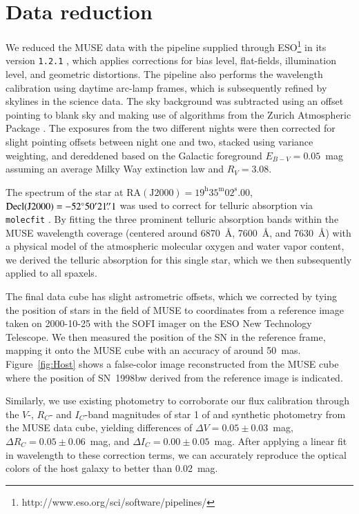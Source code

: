 \documentclass[traditabstract]{aa}
\newcommand{\farc}{\hbox{$.\!\!^{\prime\prime}$}}
\begin{document}
\section{Data reduction}
\label{sec:red}
We reduced the MUSE data with the pipeline supplied through ESO\footnote{http://www.eso.org/sci/software/pipelines/} in its version \texttt{1.2.1} \citep{2014ASPC..485..451W}, which applies corrections for bias level, flat-fields, illumination level, and geometric distortions. The pipeline also performs the wavelength calibration using daytime arc-lamp frames, which is subsequently refined by skylines in the science data. The sky background was subtracted using an offset pointing to blank sky and making use of algorithms from the Zurich Atmospheric Package \citep{2016MNRAS.458.3210S}. The exposures from the two different nights were then corrected for slight pointing offsets between night one and two, stacked using variance weighting, and dereddened based on the Galactic foreground $E_{B-V}=0.05$~mag \citep{2011ApJ...737..103S} assuming an average Milky Way extinction law \citep{1992ApJ...395..130P} and $R_V=3.08$. 

{The spectrum of the star at $\mathrm{RA(J2000)=19^{h}35^{m}02^{s}.00}$, $\mathrm{Decl(J2000)} = -52\degr50\arcmin21\farc{1}$ was used to correct for telluric absorption via \texttt{molecfit} \citep{2015A&A...576A..77S}. By fitting the three prominent telluric absorption bands within the MUSE wavelength coverage (centered around 6870~\AA, 7600~\AA, and 7630~\AA) with a physical model of the atmospheric molecular oxygen and water vapor content, we derived the telluric absorption for this single star, which we then subsequently applied to all spaxels.}

The final data cube has slight astrometric offsets, which we corrected by tying the position of stars in the field of MUSE to coordinates from a reference image taken on 2000-10-25 with the SOFI imager on the ESO New Technology Telescope. We then measured the position of the SN in the reference frame, mapping it onto the MUSE cube with an accuracy of around 50~mas. Figure~\ref{fig:Host} shows a false-color image reconstructed from the MUSE cube where the position of SN~1998bw derived from the reference image is indicated.

Similarly, we use existing photometry to corroborate our flux calibration through the $V$-, $R_C$- and $I_C$-band magnitudes of star 1 of \citet{2011AJ....141..163C} and synthetic photometry from the MUSE data cube, yielding differences of $\Delta V = 0.05\pm0.03$~mag, $\Delta R_C = 0.05\pm0.06$~mag, and $\Delta I_C = 0.00\pm0.05$~mag. After applying a linear fit in wavelength to these correction terms, we can accurately reproduce the optical colors of the host galaxy \citep{2005NewA...11..103S} to better than 0.02~mag.
\end{document}

